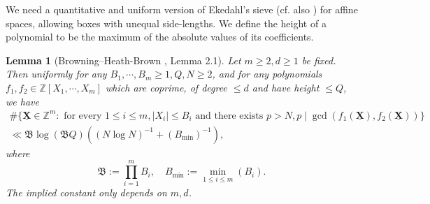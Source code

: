 \documentclass[11pt,letterpaper]{amsart}
\newcommand{\BZ}{{\mathbb {Z}}}
\newcommand{\FB}{\mathfrak{B}}
\newcommand{\XX}{\underline{\mathbf{X}}}
\theoremstyle{plain}
\numberwithin{equation}{section}
\newtheorem{lemma}[theorem]{Lemma}
\theoremstyle{definition}
\theoremstyle{remark}
\begin{document}
We need a quantitative and uniform version of Ekedahl's sieve \cite{Ekedahl} (cf. also \cite[Lemma 3.1 \& Theorem 3.3]{Bhargava}) for affine spaces,  allowing boxes with unequal side-lengths. 
We define the height of a polynomial to be the maximum of the absolute values of its coefficients.
\begin{lemma}[Browning--Heath-Brown \cite{Browning-HB}, Lemma 2.1]\label{le:EkedahlBrHB}
	Let $m\geqslant 2,d\geqslant 1$ be fixed. Then uniformly for any $B_1,\cdots,B_m\geqslant 1,Q,N\geqslant 2$, and for any polynomials $f_1,f_2\in\BZ[X_1,\cdots,X_m]$ which are coprime, of degree $\leqslant d$ and have height $\leqslant Q$, we have
	\begin{multline*}
		\#\{\XX\in\BZ^m:\text{ for every }1\leqslant  i\leqslant m,|X_i|\leqslant B_i \text{ and there exists } p>N,p\mid \gcd(f_1(\XX),f_2(\XX))\}\\
		\ll \FB\log (\FB Q)\left((N\log N)^{-1}+(B_{\min})^{-1}\right),
	\end{multline*}
 where $$\FB:=\prod_{i=1}^{m}B_i,\quad B_{\min}:=\min_{1\leqslant i\leqslant m}(B_i).$$ The implied constant only depends on $m,d$.
\end{lemma}
\end{document}
